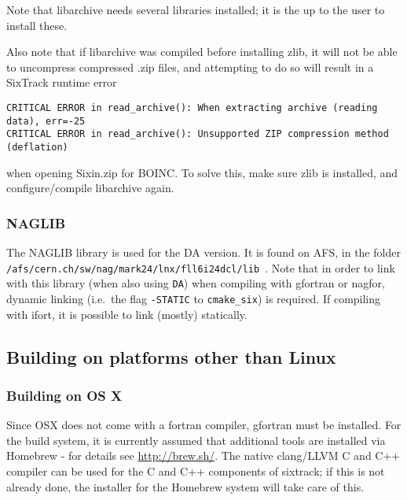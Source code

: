 \documentclass[english,BCOR=0mm,DIV=18]{scrartcl}
\begin{document}
Note that libarchive needs several libraries installed; it is the up to the user to install these.

Also note that if libarchive was compiled before installing zlib, it will not be able to uncompress compressed .zip files, and attempting to do so will result in a SixTrack runtime error
\begin{verbatim}
CRITICAL ERROR in read_archive(): When extracting archive (reading data), err=-25
CRITICAL ERROR in read_archive(): Unsupported ZIP compression method (deflation)
\end{verbatim}
when opening Sixin.zip for BOINC.
To solve this, make sure zlib is installed, and configure/compile libarchive again.

\subsubsection{NAGLIB}
\label{sec:building:libs:naglib}
The NAGLIB library  is used for the DA version.
It is found on AFS, in the folder \texttt{/afs/cern.ch/sw/nag/mark24/lnx/fll6i24dcl/lib}~.
Note that in order to link with this library (when also using \texttt{DA}) when compiling with gfortran or nagfor, dynamic linking (i.e.\ the flag \texttt{-STATIC} to \texttt{cmake\_six}) is required.
If compiling with ifort, it is possible to link (mostly) statically.

\subsection{Building on platforms other than Linux}

\subsubsection{Building on OS X}

Since OSX does not come with a fortran compiler, gfortran must be installed.
For the build system, it is currently assumed that additional tools are installed via Homebrew - for details see \url{http://brew.sh/}.
The native clang/LLVM C and C++ compiler can be used for the C and C++ components of sixtrack; if this is not already done, the installer for the Homebrew system will take care of this.
\end{document}
